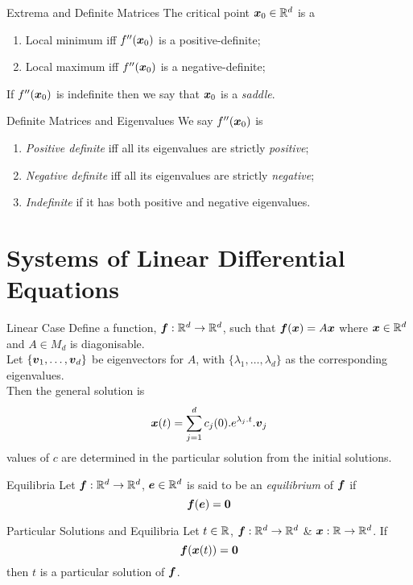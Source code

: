 \documentclass[11pt,a4paper]{article}
\begin{document}
\subtitle{Theorem 15.10 - }{Extrema and Definite Matrices}
The critical point $\boldsymbol{x}_0 \in \mathbb{R}^d$ is a
\begin{enumerate}[label=\roman*)]
  \item Local minimum iff $f''(\boldsymbol{x}_0)$ is a positive-definite;
  \item Local maximum iff $f''(\boldsymbol{x}_0)$ is a negative-definite;
\end{enumerate}
If $f''(\boldsymbol{x}_0)$ is indefinite then we say that $\boldsymbol{x}_0$ is a \textit{saddle}.\\

\subtitle{Theorem 15.11 - }{Definite Matrices and Eigenvalues}
We say $f''(\boldsymbol{x}_0)$ is
\begin{enumerate}[label=\roman*)]
  \item \textit{Positive definite} iff all its eigenvalues are strictly \textit{positive};
  \item \textit{Negative definite} iff all its eigenvalues are strictly \textit{negative};
  \item \textit{Indefinite} if it has both positive and negative eigenvalues.
\end{enumerate}

\section{Systems of Linear Differential Equations}

\subtitle{Theorem 16.01 - }{Linear Case}
Define a function, $\boldsymbol{f} : \mathbb{R}^d \to \mathbb{R}^d$, such that $\boldsymbol{f}(\boldsymbol{x}) = A\boldsymbol{x}$ where $\boldsymbol{x} \in \mathbb{R}^d$ and $A \in M_d$ is diagonisable.\\
Let $\{\boldsymbol{v}_1 , \dots , \boldsymbol{v}_d \}$ be eigenvectors for $A$, with $\{ \lambda_1 , \dots , \lambda_d \}$ as the corresponding eigenvalues.\\
Then the general solution is $$\boldsymbol{x}(t) = \sum_{j=1}^d c_j(0) . e^{\lambda_j.t}.\boldsymbol{v}_j$$ values of $c$ are determined in the particular solution from the initial solutions.\\

\subtitle{Definition 16.02 - }{Equilibria}
Let $\boldsymbol{f} : \mathbb{R}^d \to \mathbb{R}^d$, $\boldsymbol{e} \in \mathbb{R}^d$ is said to be an \textit{equilibrium} of $\boldsymbol{f}$ if
$$\boldsymbol{f}(\boldsymbol{e}) = \boldsymbol{0}$$

\subtitle{Theorem 16.03 - }{Particular Solutions and Equilibria}
Let $t \in \mathbb{R}$, $\boldsymbol{f} : \mathbb{R}^d \to \mathbb{R}^d$ \& $\boldsymbol{x} : \mathbb{R} \to \mathbb{R}^d$. If
$$\boldsymbol{f}(\boldsymbol{x}(t)) = \boldsymbol{0} $$
then $t$ is a particular solution of $\boldsymbol{f}$.\\
\end{document}
